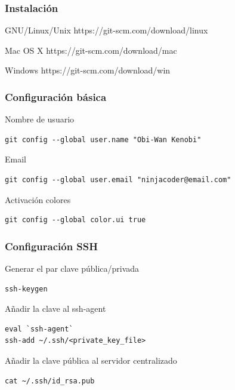 \documentclass{beamer}
\begin{document}
\begin{frame}
\frametitle{Instalación}
\begin{block}{GNU/Linux/Unix}
https://git-scm.com/download/linux
\end{block}
\vskip 0.50cm
\begin{block}{Mac OS X}
https://git-scm.com/download/mac
\end{block}
\vskip 0.50cm
\begin{block}{Windows}
https://git-scm.com/download/win
\end{block}
\end{frame}

\begin{frame}[fragile]
\frametitle{Configuración básica}
\begin{block}{Nombre de usuario}
\begin{verbatim}
git config --global user.name "Obi-Wan Kenobi"
\end{verbatim}
\end{block}
\begin{block}{Email}
\begin{verbatim}
git config --global user.email "ninjacoder@email.com"
\end{verbatim}
\end{block}
\begin{block}{Activación colores}
\begin{verbatim}
git config --global color.ui true
\end{verbatim}
\end{block}
\end{frame}

\begin{frame}[fragile]
\frametitle{Configuración SSH}
\begin{block}{Generar el par clave pública/privada}
\begin{verbatim}
ssh-keygen
\end{verbatim}
\end{block}
\begin{block}{Añadir la clave al ssh-agent}
\begin{verbatim}
eval `ssh-agent`
ssh-add ~/.ssh/<private_key_file>
\end{verbatim}
\end{block}
\begin{block}{Añadir la clave pública al servidor centralizado}
\begin{verbatim}
cat ~/.ssh/id_rsa.pub
\end{verbatim}
\end{block}
\end{frame}
\end{document}
